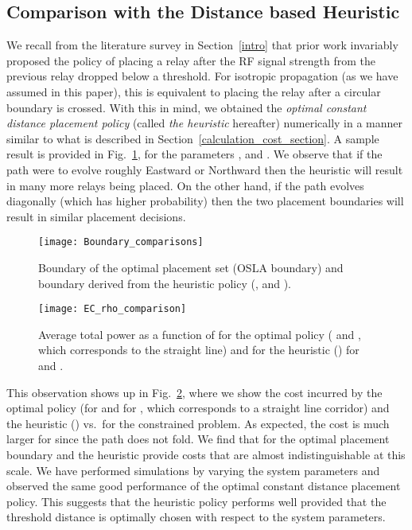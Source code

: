 \documentclass[conference]{IEEEtran}
\begin{document}
\subsection{Comparison with the Distance based Heuristic}
\label{distance_heuristic_section}
We recall from the literature survey in Section~\ref{intro} that prior work invariably proposed 
the policy of placing a relay after the RF signal strength from the previous relay dropped 
below a threshold. For isotropic propagation (as we have assumed in this paper), this is 
equivalent to placing the relay after a circular boundary is crossed. With this in mind, we 
obtained the \emph{optimal constant distance placement policy} (called \emph{the heuristic} 
hereafter) numerically in a manner similar to what is described in 
Section~\ref{calculation_cost_section}. A sample result is provided in 
Fig.~\ref{boundary_comparisons_figure}, for the parameters ,  and . We 
observe that if the path were to evolve roughly Eastward or Northward then the heuristic will 
result in many more relays being placed. On the other hand, if the path evolves diagonally 
(which has higher probability) then the two placement boundaries will result in similar 
placement decisions. 


\begin{figure}[t!]
\centering
\texttt{[image: Boundary\_comparisons]}
\caption{Boundary of the optimal placement set (OSLA boundary) and boundary derived from the 
heuristic policy (,  and ). }
\label{boundary_comparisons_figure}
\vspace{-4mm}
\end{figure}

\begin{figure}[t]
\centering
\texttt{[image: EC\_rho\_comparison]}
\caption{Average total power as a function of  for the optimal policy ( and , 
which corresponds to the straight line) and for the heuristic () for  and 
.}
\label{EC_rho_comparison_figure}
\vspace{-6mm}
\end{figure}

This observation shows up in Fig.~\ref{EC_rho_comparison_figure}, where we show the cost 
incurred by the optimal policy (for  and for , which corresponds to a straight line 
corridor) and the heuristic () vs.\  for the constrained problem. As expected, the 
cost is much larger for  since the path does not fold. We find that for  the 
optimal placement boundary and the heuristic provide costs that are almost indistinguishable at 
this scale. We have performed simulations by varying the system parameters and observed the 
same good performance of the optimal constant distance placement policy. This suggests that the 
heuristic policy performs well provided that the threshold distance is optimally chosen with 
respect to the system parameters. 
\end{document}
